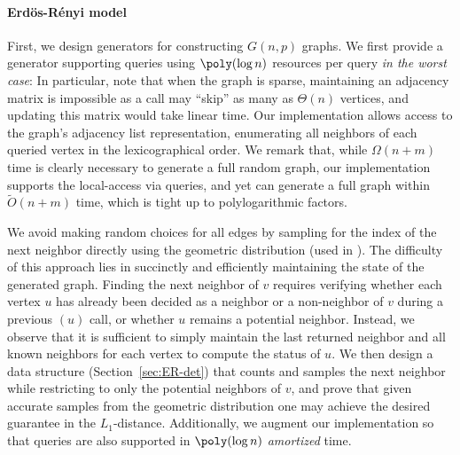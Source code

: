 \paragraph{Erd\"{o}s-R\'{e}nyi model}
First, we design generators for constructing $G(n,p)$ graphs.
We first provide a generator supporting  queries using $\poly(\log n)$ resources per query \emph{in the worst case}:  
In particular, note that when the graph is sparse,
maintaining an adjacency matrix is impossible as a  call may ``skip'' as many as $\Theta(n)$ vertices, and updating this matrix would take linear time. 
Our implementation allows access to the graph's adjacency list representation, enumerating all neighbors of each queried vertex in the lexicographical order. 
We remark that, while $\Omega(n+m)$ time is clearly necessary to generate a full random graph, our implementation supports the local-access via  queries, and yet can generate a full graph within $\widetilde{O}(n+m)$ time, which is tight up to polylogarithmic factors.

We avoid making random choices for all edges by sampling for the index of the next neighbor directly using the geometric distribution (used in \cite{er_gen}).
The difficulty of this approach lies in succinctly and efficiently maintaining the state of the generated graph.
Finding the next neighbor of $v$ requires verifying whether each vertex $u$ has already been decided as a neighbor or a non-neighbor of $v$ during a previous $(u)$ call, or whether $u$ remains a potential neighbor.
Instead, we observe that it is sufficient to simply maintain the last returned neighbor and all known neighbors for each vertex to compute the status of $u$. We then design a data structure (Section~\ref{sec:ER-det}) that counts and samples the next neighbor while restricting to only the potential neighbors of $v$, and prove that given accurate samples from the geometric distribution one may achieve the desired guarantee in the $L_1$-distance. Additionally, we augment our implementation so that  queries are also supported in $\poly(\log n)$ \emph{amortized} time.

